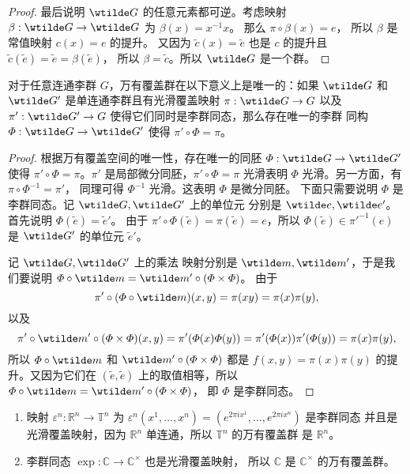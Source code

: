 \begin{proof}
  最后说明 $\wtilde G$ 的任意元素都可逆。考虑映射 $\beta:\wtilde G\to\wtilde G$
  为 $ \beta(x)=x^{-1}x $。
  那么 $ \pi\circ\beta(x)=e$，
  所以 $\beta$ 是常值映射 $c(x)=e$ 的提升。
  又因为 $\tilde c(x)=\tilde e$ 也是 $c$ 的提升且 $\tilde c(\tilde e)=\tilde e=\beta(\tilde e)$，
  所以 $\beta=\tilde c$。所以 $\wtilde G$ 是一个群。
\end{proof}

\begin{theorem}[万有覆盖群的唯一性]
  对于任意连通李群 $G$，万有覆盖群在以下意义上是唯一的：如果 $\wtilde G$
  和 $\wtilde G'$ 是单连通李群且有光滑覆盖映射 $\pi:\wtilde G\to G$
  以及 $\pi':\wtilde G'\to G$ 使得它们同时是李群同态，那么存在唯一的李群
  同构 $\varPhi:\wtilde G\to \wtilde G'$ 使得 $\pi'\circ\varPhi=\pi$。
\end{theorem}
\begin{proof}
  根据万有覆盖空间的唯一性，存在唯一的同胚 $\varPhi:\wtilde G\to\wtilde G'$
  使得 $\pi'\circ\varPhi =\pi$。$\pi'$ 是局部微分同胚，$\pi'\circ\varPhi=\pi$
  光滑表明 $\varPhi$ 光滑。另一方面，有 $\pi\circ\varPhi^{-1}=\pi'$，
  同理可得 $\varPhi^{-1}$ 光滑。这表明 $\varPhi$ 是微分同胚。
  下面只需要说明 $\varPhi$ 是李群同态。记 $\wtilde G,\wtilde G'$ 上的单位元
  分别是 $\wtilde e,\wtilde e'$。首先说明 $\varPhi(\tilde e)=\tilde e'$。
  由于 $\pi'\circ\varPhi(\tilde e)=\pi(\tilde e)=e$，所以 $\varPhi(\tilde e)\in\pi'^{-1}(e)$
  是 $\wtilde G'$ 的单位元 $\tilde e'$。
  
  记 $\wtilde G,\wtilde G'$ 上的乘法
  映射分别是 $\wtilde m,\wtilde m'$，于是我们要说明 $\varPhi\circ\wtilde m=\wtilde m'\circ(\varPhi\times\varPhi)$。
  由于
  \[
    \pi'\circ (\varPhi\circ\wtilde m)
    (x,y)=\pi(xy)=\pi(x)\pi(y),
  \]
  以及
  \[
    \pi'\circ \wtilde m'\circ(\varPhi\times\varPhi)(x,y)
    =\pi'(\varPhi(x)\varPhi(y))=\pi'(\varPhi(x))\pi'(\varPhi(y))=\pi(x)\pi(y),
  \]
  所以 $\varPhi\circ\wtilde m$ 和 $\wtilde m'\circ(\varPhi\times\varPhi)$
  都是 $f(x,y)=\pi(x)\pi(y)$ 的提升。又因为它们在 $(\tilde e,\tilde e)$
  上的取值相等，所以 $\varPhi\circ\wtilde m=\wtilde m'\circ(\varPhi\times\varPhi)$，
  即 $\varPhi$ 是李群同态。
\end{proof}


\begin{example}[万有覆盖群]
  \mbox{}
  \begin{enumerate}
    \item 映射 $\varepsilon^n:\mathbb{R}^n\to \mathbb{T}^n$
    为 $\varepsilon^n(x^1,\dots,x^n)=(e^{2\pi ix^1},\dots,e^{2\pi ix^n})$ 是李群同态
    并且是光滑覆盖映射，因为 $\mathbb{R}^n$ 单连通，所以 $\mathbb{T}^n$ 的万有覆盖群
    是 $\mathbb{R}^n$。
    \item 李群同态 $\exp:\mathbb{C}\to \mathbb{C}^\times$ 也是光滑覆盖映射，
    所以 $\mathbb{C}$ 是 $\mathbb{C}^\times $ 的万有覆盖群。
  \end{enumerate}
\end{example}


